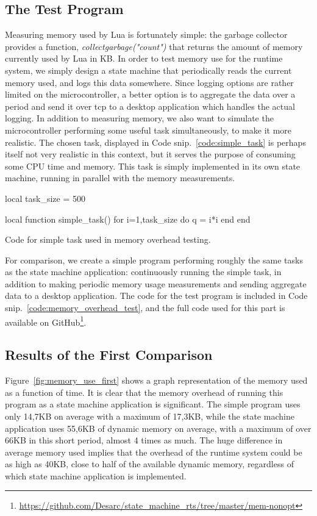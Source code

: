 \subsection{The Test Program}
\label{sec:test_program}
Measuring memory used by Lua is fortunately simple: the garbage collector provides a function, \emph{collectgarbage("count")} that returns the amount of memory currently used by Lua in KB. In order to test memory use for the runtime system, we simply design a state machine that periodically reads the current memory used, and logs this data somewhere. Since logging options are rather limited on the microcontroller, a better option is to aggregate the data over a period and send it over \gls{tcp} to a desktop application which handles the actual logging. In addition to measuring memory, we also want to simulate the microcontroller performing some useful task simultaneously, to make it more realistic. The chosen task, displayed in Code snip.~\ref{code:simple_task} is perhaps itself not very realistic in this context, but it serves the purpose of consuming some CPU time and memory. This task is simply implemented in its own state machine, running in parallel with the memory measurements.

\begin{listing}[htp]
\begin{luacode}
local task_size = 500

local function simple_task()
	for i=1,task_size do
		q = i*i
	end
end
\end{luacode}
	\caption{Code for simple task used in memory overhead testing.}
	\label{code:simple_task}
\end{listing}

For comparison, we create a simple program performing roughly the same tasks as the state machine application: continuously running the simple task, in addition to making periodic memory usage measurements and sending aggregate data to a desktop application. The code for the test program is included in Code snip.~\ref{code:memory_overhead_test}, and the full code used for this part is available on GitHub\footnote{\url{https://github.com/Desarc/state_machine_rts/tree/master/mem-nonopt}}.

\subsection{Results of the First Comparison}
\label{sec:first_comparison}
Figure~\ref{fig:memory_use_first} shows a graph representation of the memory used as a function of time. It is clear that the memory overhead of running this program as a state machine application is significant. The simple program uses only 14,7KB on average with a maximum of 17,3KB, while the state machine application uses 55,6KB of dynamic memory on average, with a maximum of over 66KB in this short period, almost 4 times as much. The huge difference in average memory used implies that the overhead of the runtime system could be as high as 40KB, close to half of the available dynamic memory, regardless of which state machine application is implemented.

